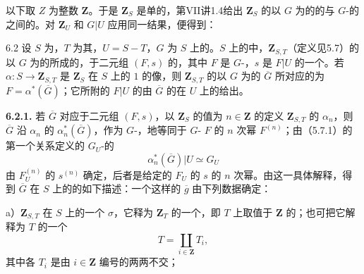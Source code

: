以下取 $Z$ 为整数 $\mathbf Z$。于是 $\mathbf Z_S$ 是单的，第VII讲1.4给出 $\mathbf Z_S$ 的以 $G$ 为的的与 $G$-的之间的。对 $\mathbf Z_U$ 和 $G|U$ 应用同一结果，便得到：
\begin{SGAresult}{}{6.2}
设 $S$ 为，$T$ 为其，$U=S-T$，$G$ 为 $S$ 上的。$S$ 上的中，$\mathbf Z_{S,T}$（定义见5.7）的以 $G$ 为的所成的，于二元组 $(F,s)$ 的，其中 $F$ 是 $G$-，$s$ 是 $F|U$ 的一个。若 $\alpha:S\to\mathbf Z_{S,T}$ 是 $\mathbf Z_S$ 在 $S$ 上的 $1$ 的像，则 $\mathbf Z_{S,T}$ 的以 $G$ 为的 $\overline G$ 所对应的为 $F=\alpha^*(\overline G)$；它所附的 $F|U$ 的由 $\overline G$ 的在 $U$ 上的给出。
\end{SGAresult}
\textbf{6.2.1.} 若 $\overline G$ 对应于二元组 $(F,s)$，以 $\mathbf Z_S$ 的值为 $n\in\mathbf Z$ 的定义 $\mathbf Z_{S,T}$ 的 $\alpha_n$，则 $\overline G$ 沿 $\alpha_n$ 的 $\alpha_n^*(\overline G)$，作为 $G$-，地等同于 $G$- $F$ 的 $n$ 次幂 $F^{(n)}$；由（5.7.1）的第一个关系定义的 $G_U$-的
\[
\alpha_n^*(\overline G)|U\simeq G_U
\]
由 $F_U^{(n)}$ 的 $s^{(n)}$ 确定，后者是给定的 $F_U$ 的 $s$ 的 $n$ 次幂。由这一具体解释，得到 $\overline G$ 在 $S$ 上的的如下描述：一个这样的 $\overline g$ 由下列数据确定：

 a）$\mathbf Z_{S,T}$ 在 $S$ 上的一个 $\sigma$，它释为 $\mathbf Z_T$ 的一个，即 $T$ 上取值于 $\mathbf Z$ 的；也可把它解释为 $T$ 的一个
\[
T=\coprod_{i\in\mathbf Z}T_i,
\]
其中各 $T_i$ 是由 $i\in\mathbf Z$ 编号的两两不交；

